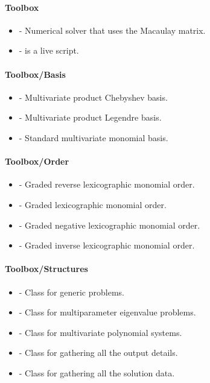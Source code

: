 \documentclass{manual}
\begin{document}
        \paragraph*{Toolbox}
        \begin{itemize}
            \item {} - Numerical solver that uses the Macaulay matrix.
            \item {} - is a live script.
        \end{itemize}

        \paragraph*{Toolbox/Basis}
        \begin{itemize}
            \item {} - Multivariate product Chebyshev basis.
            \item {} - Multivariate product Legendre basis.
            \item {} - Standard multivariate monomial basis.
        \end{itemize}

        \paragraph*{Toolbox/Order}
        \begin{itemize}
            \item {} - Graded reverse lexicographic monomial order.
            \item {} - Graded lexicographic monomial order.
            \item {} - Graded negative lexicographic monomial order.
            \item {} - Graded inverse lexicographic monomial order.
        \end{itemize}

        \paragraph*{Toolbox/Structures}
        \begin{itemize}
            \item {} - Class for generic problems.
            \item {} - Class for multiparameter eigenvalue problems.
            \item {} - Class for multivariate polynomial systems.
            \item {} - Class for gathering all the output details.
            \item {} - Class for gathering all the solution data.
        \end{itemize}
\end{document}

